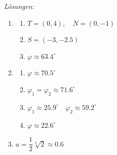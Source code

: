 \clearpage
\emph{Lösungen:}
\begin{enumerate}
    \item
    \begin{enumerate}
        \item \( T = (0, 4), \quad N = (0, -1) \)
        \item \( S = (-3, -2.5) \)
        \item \( \varphi \approx 63.4^\circ \)
    \end{enumerate}

    \item
    \begin{enumerate}
        \item \( \varphi \approx 70.5^\circ \)
        \item \( \varphi_1 = \varphi_2  \approx 71.6^\circ \)
        \item \( \varphi_1 \approx 25.9^\circ \quad \varphi_2  \approx 59.2^\circ\)
        \item \( \varphi \approx 22.6^\circ \)
    \end{enumerate}

    \item \( a = \dfrac{1}{2} \sqrt[4]{2} \approx 0.6\)
\end{enumerate}

